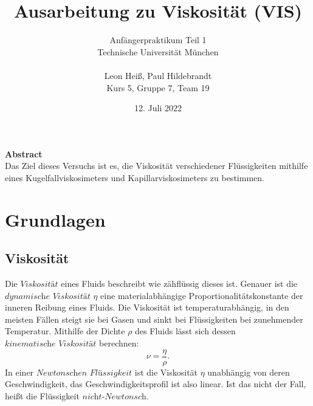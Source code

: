 \documentclass{article}
\title{Ausarbeitung zu Viskosität (VIS)}
\author{Anfängerpraktikum Teil 1 \\Technische Universität München\\\\Leon Heiß, Paul Hildebrandt \\
Kurs 5, Gruppe 7, Team 19}
\date{12. Juli 2022}
\begin{document}
\maketitle

\large
\begin{center}
\textbf{Abstract}\\
\normalsize
\medskip
Das Ziel dieses Versuchs ist es, die Viskosität verschiedener Flüssigkeiten mithilfe eines Kugelfallviskosimeters und Kapillarviskosimeters zu bestimmen.

\end{center}
\normalsize

\tableofcontents
\section{Grundlagen}
\subsection{Viskosität}
Die $\textit{Viskosität}$ eines Fluids beschreibt wie zähflüssig dieses ist. Genauer ist die $\textit{dynamische Viskosität}$ $\eta$
eine materialabhängige Proportionalitätskonstante der inneren Reibung eines Fluids. Die Viskosität ist temperaturabhängig, in den meisten Fällen steigt sie bei Gasen und sinkt bei Flüssigkeiten bei zunehmender Temperatur.
Mithilfe der Dichte $\rho$ des Fluids lässt sich dessen $\textit{kinematische Viskosität}$ berechnen:
\begin{equation}
    \nu = \frac{\eta}{\rho}.
\end{equation}
In einer $\textit{Newtonschen Flüssigkeit}$ ist die Viskosität $\eta$ unabhängig von deren Geschwindigkeit, das Geschwindigkeitsprofil ist also linear. Ist das nicht der Fall, heißt die Flüssigkeit $\textit{nicht-Newtonsch}$.
\end{document}
